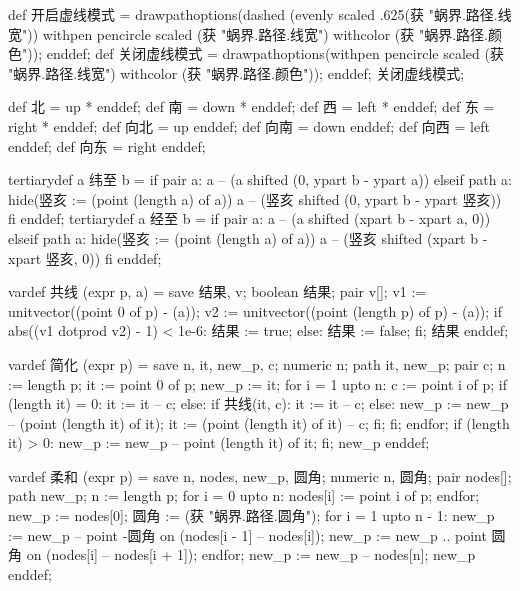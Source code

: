 \startMPinclusions[+]
def 开启虚线模式 =
  drawpathoptions(dashed (evenly scaled .625(获 "蜗界.路径.线宽"))
                  withpen pencircle scaled (获 "蜗界.路径.线宽")
                  withcolor (获 "蜗界.路径.颜色"));
enddef;
def 关闭虚线模式 =
  drawpathoptions(withpen pencircle scaled (获 "蜗界.路径.线宽")
                  withcolor (获 "蜗界.路径.颜色"));
enddef;
关闭虚线模式;
\stopMPinclusions

\startMPinclusions[+]
def 北 = up * enddef; 
def 南 = down * enddef;
def 西 = left * enddef; 
def 东 = right * enddef;
def 向北 = up enddef; 
def 向南 = down enddef;
def 向西 = left enddef; 
def 向东 = right enddef;

tertiarydef a 纬至 b = 
  if pair a:
    a -- (a shifted (0, ypart b - ypart a))
  elseif path a:
    hide(竖亥 := (point (length a) of a))
    a -- (竖亥 shifted (0, ypart b - ypart 竖亥))
  fi
enddef;
tertiarydef a 经至 b = 
  if pair a:
    a -- (a shifted (xpart b - xpart a, 0))
  elseif path a:
    hide(竖亥 := (point (length a) of a))
    a -- (竖亥 shifted (xpart b - xpart 竖亥, 0))
  fi
enddef;
\stopMPinclusions

\startMPinclusions[+]
vardef 共线 (expr p, a) =
  save 结果, v; boolean 结果; pair v[];
  v1 := unitvector((point 0 of p) - (a));
  v2 := unitvector((point (length p) of p) - (a));
  if abs((v1 dotprod v2) - 1) < 1e-6:
     结果 := true;
  else:
    结果 := false;
  fi;
  结果
enddef;

vardef 简化 (expr p) =
  save n, it, new_p, c;
  numeric n; path it, new_p; pair c;
  n := length p;
  it := point 0 of p;
  new_p := it;
  for i = 1 upto n:
    c := point i of p;
    if (length it) = 0: 
      it := it -- c;
    else:
      if 共线(it, c):
        it := it -- c;
      else:
        new_p := new_p -- (point (length it) of it);
        it := (point (length it) of it) -- c;
      fi;
    fi;
  endfor;
  if (length it) > 0:
    new_p := new_p -- point (length it) of it;
  fi;
  new_p
enddef;

vardef 柔和 (expr p) =
  save n, nodes, new_p, 圆角; 
  numeric n, 圆角; pair nodes[]; path new_p;
  n := length p;
  for i = 0 upto n:
    nodes[i] := point i of p;
  endfor;
  new_p := nodes[0];
  圆角 := (获 "蜗界.路径.圆角");
  for i = 1 upto n - 1:
    new_p := new_p -- point -圆角 on (nodes[i - 1] -- nodes[i]);
    new_p := new_p .. point 圆角 on (nodes[i] -- nodes[i + 1]);
  endfor;
  new_p := new_p -- nodes[n];
  new_p
enddef;
\stopMPinclusions


